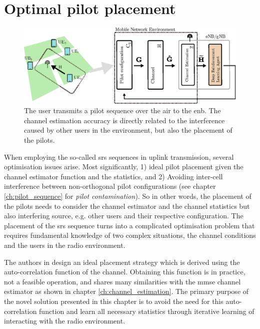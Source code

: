 \section{Optimal pilot placement}\label{sec:optimal_pilot_placement}
\begin{figure}
    \includegraphics[width=\textwidth]{chapters/part_uplink/figures/RL_introduction_maindrawing.eps}
    \caption{The user transmits a pilot sequence over the air to the \gls{enb}. The channel estimation accuracy is directly related to the interference caused by other users in the environment, but also the placement of the pilots.}\label{fig:RL_introduction_maindrawing}
\end{figure}
When employing the so-called \gls{srs} sequences in uplink transmission, several optimisation issues arise. Most significantly, 1) ideal pilot placement given the channel estimator function and the statistics, and 2) Avoiding inter-cell interference between non-orthogonal pilot configurations (see chapter \ref{ch:pilot_sequence} for \emph{pilot contamination}). So in other words, the placement of the pilots needs to consider the channel estimator and the channel statistics but also interfering source, e.g. other users and their respective configuration. The placement of the \gls{srs} sequence turns into a complicated optimisation problem that requires fundamental knowledge of two complex situations, the channel conditions and the users in the radio environment. 

The authors in \cite{Simko2013AdaptiveSystems} design an ideal placement strategy which is derived using the auto-correlation function of the channel. Obtaining this function is in practice, not a feasible operation, and shares many similarities with the \gls{mmse} channel estimator as shown in chapter \ref{ch:channel_estimation}. The primary purpose of the novel solution presented in this chapter is to avoid the need for this auto-correlation function and learn all necessary statistics through iterative learning of interacting with the radio environment. 



